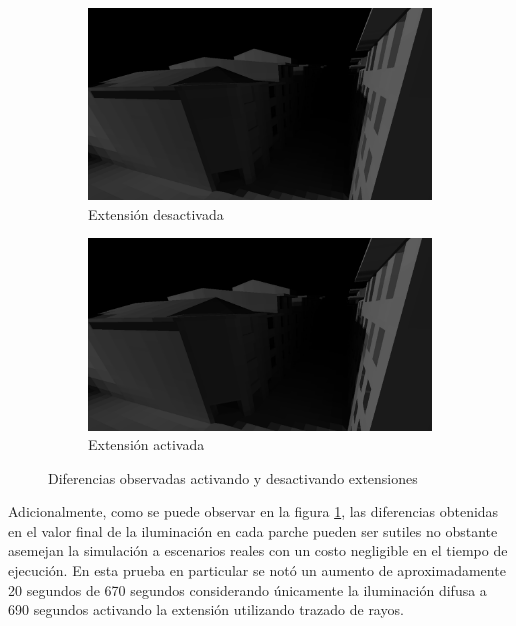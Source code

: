 \begin{figure}[H]
	\centering
	\begin{subfigure}{0.47\textwidth}
		\includegraphics[width=1\linewidth]{assets/sdif}
		\caption{Extensión desactivada}
	\end{subfigure}
	\begin{subfigure}{0.47\textwidth}
		\includegraphics[width=1\linewidth]{assets/sspec}
		\caption{Extensión activada}
	\end{subfigure}
	\caption{Diferencias observadas activando y desactivando extensiones}
	\label{img:difspecstreet}
\end{figure}

Adicionalmente, como se puede observar en la figura \ref{img:difspecstreet}, las diferencias obtenidas en el valor final de la iluminación en cada parche pueden ser sutiles no obstante asemejan la simulación a escenarios reales con un costo negligible en el tiempo de ejecución. En esta prueba en particular se notó un aumento de aproximadamente 20 segundos de 670 segundos considerando únicamente la iluminación difusa a 690 segundos activando la extensión utilizando trazado de rayos.

